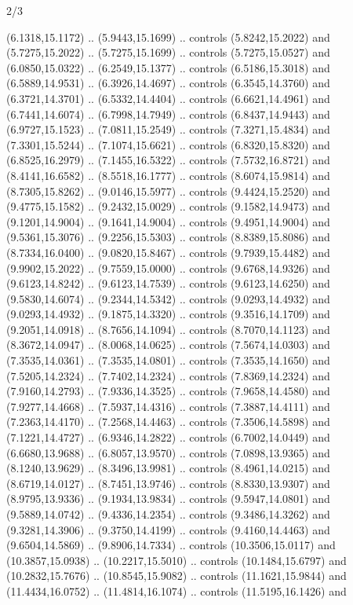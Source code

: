 \begin{flagdescription}{2/3}
\begin{scope}[yshift=\flagwidth,scale=\flagwidth/1241.93737]
\begin{scope}[y=-1mm, x=1mm,draw=gold,fill=blue,line join=miter,miter limit=4,line width=1.8\lw]
{  (6.1318,15.1172) .. (5.9443,15.1699) .. controls (5.8242,15.2022) and
  (5.7275,15.2022) .. (5.7275,15.1699) .. controls (5.7275,15.0527) and
  (6.0850,15.0322) .. (6.2549,15.1377) .. controls (6.5186,15.3018) and
  (6.5889,14.9531) .. (6.3926,14.4697) .. controls (6.3545,14.3760) and
  (6.3721,14.3701) .. (6.5332,14.4404) .. controls (6.6621,14.4961) and
  (6.7441,14.6074) .. (6.7998,14.7949) .. controls (6.8437,14.9443) and
  (6.9727,15.1523) .. (7.0811,15.2549) .. controls (7.3271,15.4834) and
  (7.3301,15.5244) .. (7.1074,15.6621) .. controls (6.8320,15.8320) and
  (6.8525,16.2979) .. (7.1455,16.5322) .. controls (7.5732,16.8721) and
  (8.4141,16.6582) .. (8.5518,16.1777) .. controls (8.6074,15.9814) and
  (8.7305,15.8262) .. (9.0146,15.5977) .. controls (9.4424,15.2520) and
  (9.4775,15.1582) .. (9.2432,15.0029) .. controls (9.1582,14.9473) and
  (9.1201,14.9004) .. (9.1641,14.9004) .. controls (9.4951,14.9004) and
  (9.5361,15.3076) .. (9.2256,15.5303) .. controls (8.8389,15.8086) and
  (8.7334,16.0400) .. (9.0820,15.8467) .. controls (9.7939,15.4482) and
  (9.9902,15.2022) .. (9.7559,15.0000) .. controls (9.6768,14.9326) and
  (9.6123,14.8242) .. (9.6123,14.7539) .. controls (9.6123,14.6250) and
  (9.5830,14.6074) .. (9.2344,14.5342) .. controls (9.0293,14.4932) and
  (9.0293,14.4932) .. (9.1875,14.3320) .. controls (9.3516,14.1709) and
  (9.2051,14.0918) .. (8.7656,14.1094) .. controls (8.7070,14.1123) and
  (8.3672,14.0947) .. (8.0068,14.0625) .. controls (7.5674,14.0303) and
  (7.3535,14.0361) .. (7.3535,14.0801) .. controls (7.3535,14.1650) and
  (7.5205,14.2324) .. (7.7402,14.2324) .. controls (7.8369,14.2324) and
  (7.9160,14.2793) .. (7.9336,14.3525) .. controls (7.9658,14.4580) and
  (7.9277,14.4668) .. (7.5937,14.4316) .. controls (7.3887,14.4111) and
  (7.2363,14.4170) .. (7.2568,14.4463) .. controls (7.3506,14.5898) and
  (7.1221,14.4727) .. (6.9346,14.2822) .. controls (6.7002,14.0449) and
  (6.6680,13.9688) .. (6.8057,13.9570) .. controls (7.0898,13.9365) and
  (8.1240,13.9629) .. (8.3496,13.9981) .. controls (8.4961,14.0215) and
  (8.6719,14.0127) .. (8.7451,13.9746) .. controls (8.8330,13.9307) and
  (8.9795,13.9336) .. (9.1934,13.9834) .. controls (9.5947,14.0801) and
  (9.5889,14.0742) .. (9.4336,14.2354) .. controls (9.3486,14.3262) and
  (9.3281,14.3906) .. (9.3750,14.4199) .. controls (9.4160,14.4463) and
  (9.6504,14.5869) .. (9.8906,14.7334) .. controls (10.3506,15.0117) and
  (10.3857,15.0938) .. (10.2217,15.5010) .. controls (10.1484,15.6797) and
  (10.2832,15.7676) .. (10.8545,15.9082) .. controls (11.1621,15.9844) and
  (11.4434,16.0752) .. (11.4814,16.1074) .. controls (11.5195,16.1426) and
}
\end{scope}
\end{scope}
\end{flagdescription}
